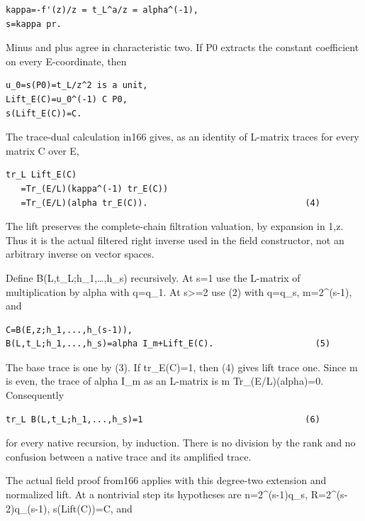 \begin{Verbatim}[fontsize=\small,breaklines=true,breakanywhere=true]
kappa=-f'(z)/z = t_L^a/z = alpha^(-1),
s=kappa pr.
\end{Verbatim}

Minus and plus agree in characteristic two. If P0 extracts the constant
coefficient on every E-coordinate, then

\begin{Verbatim}[fontsize=\small,breaklines=true,breakanywhere=true]
u_0=s(P0)=t_L/z^2 is a unit,
Lift_E(C)=u_0^(-1) C P0,
s(Lift_E(C))=C.
\end{Verbatim}

The trace-dual calculation in166 gives, as an identity of L-matrix
traces for every matrix C over E,

\begin{Verbatim}[fontsize=\small,breaklines=true,breakanywhere=true]
tr_L Lift_E(C)
   =Tr_(E/L)(kappa^(-1) tr_E(C))
   =Tr_(E/L)(alpha tr_E(C)).                               (4)
\end{Verbatim}

The lift preserves the complete-chain filtration valuation, by expansion
in 1,z. Thus it is the actual filtered right inverse used in the field
constructor, not an arbitrary inverse on vector spaces.

Define B(L,t\_L;h\_1,\ldots,h\_s) recursively. At s=1 use the L-matrix
of multiplication by alpha with q=q\_1. At s\textgreater=2 use (2) with
q=q\_s, m=2\^{}(s-1), and

\begin{Verbatim}[fontsize=\small,breaklines=true,breakanywhere=true]
C=B(E,z;h_1,...,h_(s-1)),
B(L,t_L;h_1,...,h_s)=alpha I_m+Lift_E(C).                    (5)
\end{Verbatim}

The base trace is one by (3). If tr\_E(C)=1, then (4) gives lift trace
one. Since m is even, the trace of alpha I\_m as an L-matrix is m
Tr\_(E/L)(alpha)=0. Consequently

\begin{Verbatim}[fontsize=\small,breaklines=true,breakanywhere=true]
tr_L B(L,t_L;h_1,...,h_s)=1                                (6)
\end{Verbatim}

for every native recursion, by induction. There is no division by the
rank and no confusion between a native trace and its amplified trace.

The actual field proof from166 applies with this degree-two extension
and normalized lift. At a nontrivial step its hypotheses are
n=2\^{}(s-1)q\_s, R=2\^{}(s-2)q\_(s-1), s(Lift(C))=C, and

